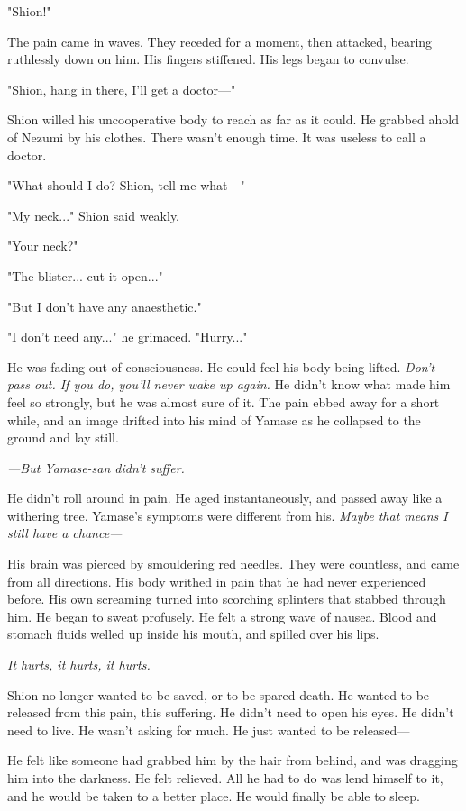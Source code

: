 "Shion!"

The pain came in waves. They receded for a moment, then attacked,
bearing ruthlessly down on him. His fingers stiffened. His legs began to
convulse.

"Shion, hang in there, I'll get a doctor---"

Shion willed his uncooperative body to reach as far as it could. He
grabbed ahold of Nezumi by his clothes. There wasn't enough time. It was
useless to call a doctor.

"What should I do? Shion, tell me what---"

"My neck..." Shion said weakly.

"Your neck?"

"The blister... cut it open..."

"But I don't have any anaesthetic."

"I don't need any..." he grimaced. "Hurry..."

He was fading out of consciousness. He could feel his body being lifted.
\emph{Don't pass out. If you do, you'll never wake up again.} He didn't know
what made him feel so strongly, but he was almost sure of it. The pain
ebbed away for a short while, and an image drifted into his mind of
Yamase as he collapsed to the ground and lay still.

\emph{---But Yamase-san didn't suffer.}

He didn't roll around in pain. He aged instantaneously, and passed away
like a withering tree. Yamase's symptoms were different from his. \emph{Maybe
that means I still have a chance---}

His brain was pierced by smouldering red needles. They were countless,
and came from all directions. His body writhed in pain that he had never
experienced before. His own screaming turned into scorching splinters
that stabbed through him. He began to sweat profusely. He felt a strong
wave of nausea. Blood and stomach fluids welled up inside his mouth, and
spilled over his lips.

\emph{It hurts, it hurts, it hurts.}

Shion no longer wanted to be saved, or to be spared death. He wanted to
be released from this pain, this suffering. He didn't need to open his
eyes. He didn't need to live. He wasn't asking for much. He just wanted
to be released---

He felt like someone had grabbed him by the hair from behind, and was
dragging him into the darkness. He felt relieved. All he had to do was
lend himself to it, and he would be taken to a better place. He would
finally be able to sleep.

